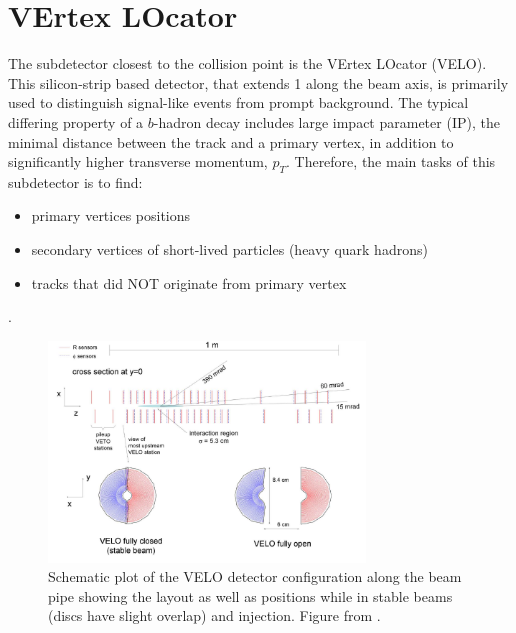 
\section{VErtex LOcator }
\label{velosys}
The subdetector closest to the collision point is the VErtex LOcator (\Gls{VELO}). This silicon-strip based detector, that extends 1 \m along the beam axis, is primarily used to distinguish signal-like events from prompt background. The typical differing property of a $b$-hadron decay includes large impact parameter (\Gls{IP}), the minimal distance between the track and a  primary vertex, in addition to significantly higher transverse momentum, $p_{T}$. Therefore, the main tasks of this subdetector is to find: 
\begin{itemize}
\item primary vertices positions
\item secondary vertices of short-lived particles (heavy quark hadrons)
\item tracks that did NOT originate from primary vertex
\end{itemize}.


\begin{figure}[!h]
	\centering
	\includegraphics[width = 0.75\textwidth]{figs/detector/license/Velo_croped.pdf}
	\caption{Schematic plot of the \Gls{VELO} detector configuration along the beam pipe showing the layout as well as positions while in stable beams (discs have slight overlap) and injection. Figure from \cite{det_paper}.}
	\label{fig:veloover}
\end{figure}

